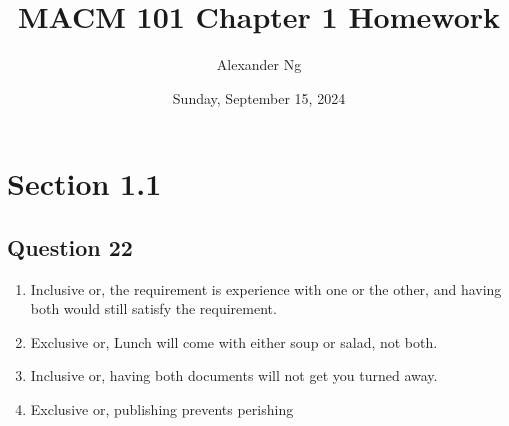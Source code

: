 \documentclass[12pt]{article}
\begin{document}
\title{MACM 101 Chapter 1 Homework}
\author{Alexander Ng}
\date{Sunday, September 15, 2024}

\maketitle

\section{Section 1.1}

\subsection{Question 22}

\begin{enumerate}[label=(\alph*)]
\item Inclusive or, the requirement is experience with one or the other, and 
  having both would still satisfy the requirement.
\item Exclusive or, Lunch will come with either soup or salad, not both.
\item Inclusive or, having both documents will not get you turned away.
\item Exclusive or, publishing prevents perishing
\end{enumerate}
\end{document}
